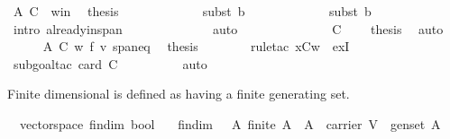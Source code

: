 \begin{isabellebody}
\ A\ C{\isacharprime}\ \ w{\isacharunderscore}in\ \isamarkupfalse%
\ {\isacharquery}thesis\ \isanewline
\ \ \ \ \ \ \ \ \ \ \isamarkupfalse%
\ {\isacharparenleft}subst\ b{}{}{\isacharparenright}\ \isanewline
\ \ \ \ \ \ \ \ \ \ \isamarkupfalse%
\ {\isacharparenleft}subst\ b{}{}{\isacharparenright}\ \isanewline
\ \ \ \ \ \ \ \ \ \ \isamarkupfalse%
\ {\isacharparenleft}intro\ already{\isacharunderscore}in{\isacharunderscore}span{\isacharparenright}\ \isanewline
\ \ \ \ \ \ \ \ \ \ \ \isamarkupfalse%
\ auto\isanewline
\ \ \ \ \ \ \ \ \isamarkupfalse%
\isanewline
\ \ \ \ \isamarkupfalse%
\ C{\isacharprime}\ {}\ {}\ \isamarkupfalse%
\ {\isacharquery}thesis\ \isamarkupfalse%
\ auto\isanewline
\ \ \isamarkupfalse%
\isanewline
\ \ \ \ \isamarkupfalse%
\ A\ C{\isacharprime}\ w\ f\ v\ spaneq{}\ \isamarkupfalse%
\ {\isacharquery}thesis\isanewline
\ \ \ \ \ \ \isamarkupfalse%
\ {\isacharparenleft}rule{\isacharunderscore}tac\ x{\isacharequal}{\isachardoublequoteopen}C{\isacharprime}{\isacharminus}{\isacharbraceleft}w{\isacharbraceright}{\isachardoublequoteclose}\ \ exI{\isacharparenright}\isanewline
\ \ \ \ \ \ \isamarkupfalse%
\ {\isacharparenleft}subgoal{\isacharunderscore}tac\ {\isachardoublequoteopen}card\ C{\isacharprime}\ {\isachargreater}{}{\isachardoublequoteclose}{\isacharparenright}\isanewline
\ \ \ \ \ \ \ \isamarkupfalse%
\ auto\isanewline
\ \ \isamarkupfalse%
\isanewline
{}\isamarkupfalse%
%
\endisatagproof
{\isafoldproof}%
%
\isadelimproof
%
\endisadelimproof
%
\isamarkuptrue%
%
\begin{isamarkuptext}%
Finite dimensional is defined as having a finite generating set.%
\end{isamarkuptext}%
\isamarkuptrue%
\isamarkupfalse%
\ {\isacharparenleft}\ vectorspace{\isacharparenright}\ fin{\isacharunderscore}dim{\isacharcolon}{\isacharcolon}\ {\isachardoublequoteopen}bool{\isachardoublequoteclose}\isanewline
\ \ \ {\isachardoublequoteopen}fin{\isacharunderscore}dim\ {\isacharequal}\ {\isacharparenleft}{\isasymexists}\ A{\isachardot}\ {\isacharparenleft}{\isacharparenleft}finite\ A{\isacharparenright}\ {\isasymand}\ {\isacharparenleft}A\ {\isasymsubseteq}\ carrier\ V{\isacharparenright}\ {\isasymand}\ {\isacharparenleft}gen{\isacharunderscore}set\ A{\isacharparenright}{\isacharparenright}{\isacharparenright}{\isachardoublequoteclose}%

\end{isabellebody}
